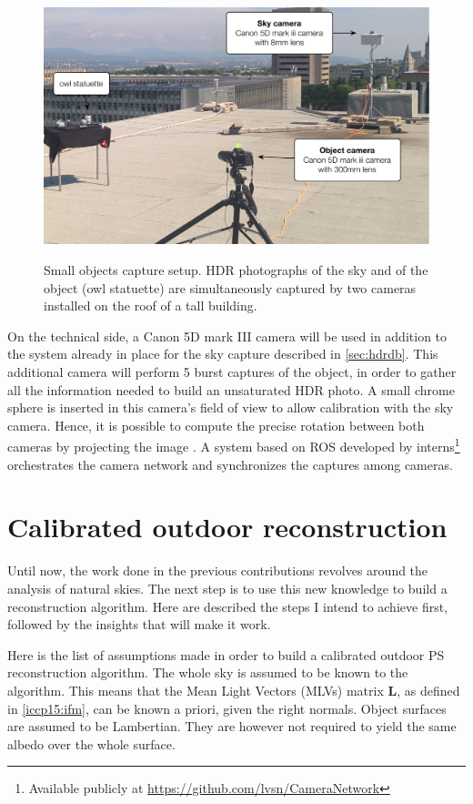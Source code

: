 \begin{figure}
    \centering
    \includegraphics[width=.52\linewidth]{./figures/realData/realData-setup.pdf} \\[1mm]
    \caption{Small objects capture setup. HDR photographs of the sky and of the object (owl statuette) are simultaneously captured by two cameras installed on the roof of a tall building.}
    \label{fig:proposed-real-data-setup}
\end{figure}


On the technical side, a Canon 5D mark III camera will be used in addition to the system already in place for the sky capture described in \ref{sec:hdrdb}. This additional camera will perform 5 burst captures of the object, in order to gather all the information needed to build an unsaturated HDR photo. A small chrome sphere is inserted in this camera's field of view to allow calibration with the sky camera. Hence, it is possible to compute the precise rotation between both cameras by projecting the image . A system based on ROS developed by interns\footnote{Available publicly at \url{https://github.com/lvsn/CameraNetwork}} orchestrates the camera network and synchronizes the captures among cameras.


\section{Calibrated outdoor reconstruction}
\label{sec:calib}

Until now, the work done in the previous contributions revolves around the analysis of natural skies. The next step is to use this new knowledge to build a reconstruction algorithm. Here are described the steps I intend to achieve first, followed by the insights that will make it work.

Here is the list of assumptions made in order to build a calibrated outdoor PS reconstruction algorithm. The whole sky is assumed to be known to the algorithm. This means that the Mean Light Vectors (MLVs) matrix $\mathbf{L}$, as defined in \ref{iccp15:ifm}, can be known a priori, given the right normals. Object surfaces are assumed to be Lambertian. They are however not required to yield the same albedo over the whole surface.

